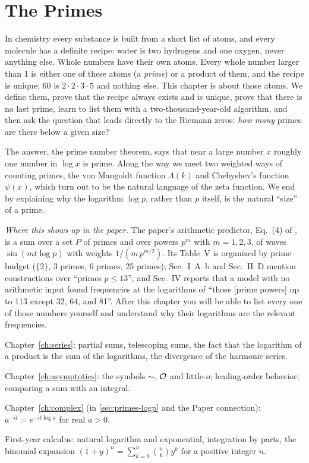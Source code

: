 \chapter{The Primes}\label{ch:primes}

\begin{chapterintro}
In chemistry every substance is built from a short list of atoms, and every molecule has a definite recipe: water is two hydrogens and one oxygen, never anything else. Whole numbers have their own atoms. Every whole number larger than 1 is either one of these atoms (a \emph{prime}) or a product of them, and the recipe is unique: $60$ is $2\cdot2\cdot3\cdot5$ and nothing else. This chapter is about those atoms. We define them, prove that the recipe always exists and is unique, prove that there is no last prime, learn to list them with a two-thousand-year-old algorithm, and then ask the question that leads directly to the Riemann zeros: \emph{how many} primes are there below a given size?

The answer, the prime number theorem, says that near a large number $x$ roughly one number in $\log x$ is prime. Along the way we meet two weighted ways of counting primes, the von Mangoldt function $\Lambda(k)$ and Chebyshev's function $\psi(x)$, which turn out to be the natural language of the zeta function. We end by explaining why the logarithm $\log p$, rather than $p$ itself, is the natural ``size'' of a prime.

\emph{Where this shows up in the paper.} The paper's arithmetic predictor, Eq.~(4) of \cite{soniR1}, is a sum over a set $P$ of primes and over powers $p^m$ with $m=1,2,3$, of waves $\sin(mt\log p)$ with weights $1/(m\,p^{m/2})$. Its Table~V is organized by prime budget ($\{2\}$, 3 primes, 6 primes, 25 primes); Sec.~I~A~b and Sec.~II~D mention constructions over ``primes $p\le13$''; and Sec.~IV reports that a model with no arithmetic input found frequencies at the logarithms of ``those [prime powers] up to 113 except 32, 64, and 81''. After this chapter you will be able to list every one of those numbers yourself and understand why their logarithms are the relevant frequencies.
\end{chapterintro}

\begin{prerequisites}
\item Chapter~\ref{ch:series}: partial sums, telescoping sums, the fact that the logarithm of a product is the sum of the logarithms, the divergence of the harmonic series.
\item Chapter~\ref{ch:asymptotics}: the symbols $\sim$, $\mathcal{O}$ and little-$o$; leading-order behavior; comparing a sum with an integral.
\item Chapter~\ref{ch:complex} (in \cref{sec:primes-logp} and the Paper connection): $a^{-it}=e^{-it\log a}$ for real $a>0$.
\item First-year calculus: natural logarithm and exponential, integration by parts, the binomial expansion $(1+y)^n=\sum_{k=0}^{n}\binom{n}{k}y^k$ for a positive integer $n$.
\end{prerequisites}

